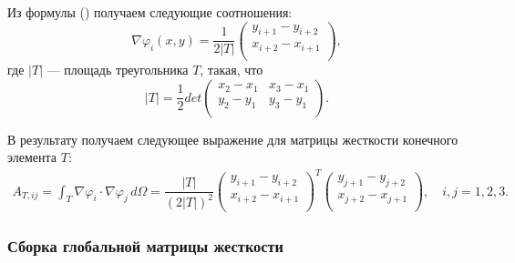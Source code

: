 \documentclass[12pt, a4paper]{article}
\renewcommand{\phi}{\varphi}
\begin{document}
				Из формулы () получаем следующие соотношения:
				\begin{equation*}
					\nabla \phi_{i}(x,y) = \dfrac{1}{2 |T|} 
					\begin{pmatrix}
						y_{i+1} - y_{i+2} \\
						x_{i+2} - x_{i+1} \\
					\end{pmatrix},
				\end{equation*}
				где $|T|$ --- площадь треугольника $T$, такая, что
				\begin{equation*}
					|T| = \dfrac{1}{2} 
					det{
						\begin{pmatrix}
							x_2 - x_1 & x_3 - x_1 \\
							y_2 - y_1 & y_3 - y_1 \\
						\end{pmatrix}				
					}.
				\end{equation*}
				
				В результату получаем следующее выражение для матрицы жесткости конечного элемента $T$:
				\begin{eqnarray}
					A_{T,ij} = \int_{T} \nabla \phi_i \cdot \nabla \phi_j \, d\Omega
					= \dfrac{|T|}{(2|T|)^2} 
					\begin{pmatrix}
						y_{i+1} - y_{i+2}\\
						x_{i+2} - x_{i+1}\\
					\end{pmatrix}^T
					\begin{pmatrix}
						y_{j+1} - y_{j+2}\\
						x_{j+2} - x_{j+1}\\
					\end{pmatrix},
					\quad i,j=1,2,3.
					\label{A_stiff_in_T}
				\end{eqnarray}
				
			\subsubsection{Сборка глобальной матрицы жесткости}
				
\end{document}

